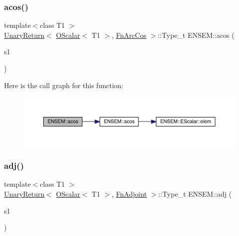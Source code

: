 \subsubsection{\texorpdfstring{acos()}{acos()}}
{\footnotesize\ttfamily template$<$class T1 $>$ \\
\mbox{\hyperlink{structENSEM_1_1UnaryReturn}{Unary\+Return}}$<$ \mbox{\hyperlink{classENSEM_1_1OScalar}{O\+Scalar}}$<$ T1 $>$, \mbox{\hyperlink{structENSEM_1_1FnArcCos}{Fn\+Arc\+Cos}} $>$\+::Type\+\_\+t E\+N\+S\+E\+M\+::acos (\begin{DoxyParamCaption}\item[{const \mbox{\hyperlink{classENSEM_1_1OScalar}{O\+Scalar}}$<$ T1 $>$ \&}]{s1 }\end{DoxyParamCaption})\hspace{0.3cm}{\ttfamily [inline]}}

Here is the call graph for this function\+:\nopagebreak
\begin{figure}[H]
\begin{center}
\leavevmode
\includegraphics[width=350pt]{d1/d71/group__obsscalar_ga734866f3eb39843cc901768dff4f6283_cgraph}
\end{center}
\end{figure}
\mbox{\label{group__obsscalar_ga08302e6d2883f4f095a5e579bce6b2b8}} 
\subsubsection{\texorpdfstring{adj()}{adj()}}
{\footnotesize\ttfamily template$<$class T1 $>$ \\
\mbox{\hyperlink{structENSEM_1_1UnaryReturn}{Unary\+Return}}$<$ \mbox{\hyperlink{classENSEM_1_1OScalar}{O\+Scalar}}$<$ T1 $>$, \mbox{\hyperlink{structENSEM_1_1FnAdjoint}{Fn\+Adjoint}} $>$\+::Type\+\_\+t E\+N\+S\+E\+M\+::adj (\begin{DoxyParamCaption}\item[{const \mbox{\hyperlink{classENSEM_1_1OScalar}{O\+Scalar}}$<$ T1 $>$ \&}]{s1 }\end{DoxyParamCaption})\hspace{0.3cm}{\ttfamily [inline]}}

